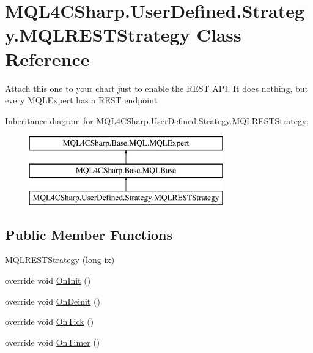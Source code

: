 \hypertarget{class_m_q_l4_c_sharp_1_1_user_defined_1_1_strategy_1_1_m_q_l_r_e_s_t_strategy}{}\section{M\+Q\+L4\+C\+Sharp.\+User\+Defined.\+Strategy.\+M\+Q\+L\+R\+E\+S\+T\+Strategy Class Reference}
\label{class_m_q_l4_c_sharp_1_1_user_defined_1_1_strategy_1_1_m_q_l_r_e_s_t_strategy}


Attach this one to your chart just to enable the R\+E\+ST A\+PI. It does nothing, but every M\+Q\+L\+Expert has a R\+E\+ST endpoint  


Inheritance diagram for M\+Q\+L4\+C\+Sharp.\+User\+Defined.\+Strategy.\+M\+Q\+L\+R\+E\+S\+T\+Strategy\+:\begin{figure}[H]
\begin{center}
\leavevmode
\includegraphics[height=3.000000cm]{class_m_q_l4_c_sharp_1_1_user_defined_1_1_strategy_1_1_m_q_l_r_e_s_t_strategy}
\end{center}
\end{figure}
\subsection*{Public Member Functions}
\begin{DoxyCompactItemize}
\item 
\hyperlink{class_m_q_l4_c_sharp_1_1_user_defined_1_1_strategy_1_1_m_q_l_r_e_s_t_strategy_a407fb3e0d610b03093eaafe3998d627e}{M\+Q\+L\+R\+E\+S\+T\+Strategy} (long \hyperlink{class_m_q_l4_c_sharp_1_1_base_1_1_m_q_l_1_1_m_q_l_expert_a98b5a835bb18c023f5160275efa74619}{ix})
\item 
override void \hyperlink{class_m_q_l4_c_sharp_1_1_user_defined_1_1_strategy_1_1_m_q_l_r_e_s_t_strategy_a5ee4ff618f282828a61ee61a9220a5cb}{On\+Init} ()
\item 
override void \hyperlink{class_m_q_l4_c_sharp_1_1_user_defined_1_1_strategy_1_1_m_q_l_r_e_s_t_strategy_aa3d7ac20d836a5fddd3110ead9320a3b}{On\+Deinit} ()
\item 
override void \hyperlink{class_m_q_l4_c_sharp_1_1_user_defined_1_1_strategy_1_1_m_q_l_r_e_s_t_strategy_a2776d742bbb47b5d03d80815db14bdb3}{On\+Tick} ()
\item 
override void \hyperlink{class_m_q_l4_c_sharp_1_1_user_defined_1_1_strategy_1_1_m_q_l_r_e_s_t_strategy_a597c3359ec7a8bf22d37c934f7fb7e6e}{On\+Timer} ()
\end{DoxyCompactItemize}
